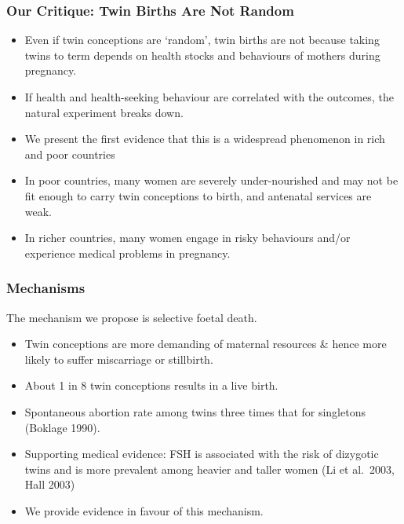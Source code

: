 \documentclass[9pt,letterpaper,subeqn]{beamer}
\begin{document}
\begin{frame}
  \frametitle{Our Critique: Twin Births Are Not Random}
  \begin{itemize}
  \item Even if twin conceptions are `random', twin births are not because taking twins to term depends on health stocks and behaviours of mothers during pregnancy.
  \item If health and health-seeking behaviour are correlated with the outcomes, the natural experiment breaks down.\\ \vspace{5mm}
  \item We present the first evidence that this is a widespread phenomenon in rich and poor countries
  \item In poor countries, many women are severely under-nourished and may not be fit enough to carry twin conceptions to birth, and antenatal services are weak. 
  \item In richer countries, many women engage in risky behaviours and/or experience medical problems in pregnancy.
  \end{itemize}
\end{frame}



\begin{frame}[label=mech1]
  \frametitle{Mechanisms}
  The mechanism we propose is selective foetal death. 
  \begin{itemize}
  \item Twin conceptions are more demanding of maternal resources \& hence more likely to suffer miscarriage or stillbirth.
  \item About 1 in 8 twin conceptions results in a live birth. 
	\item Spontaneous abortion rate among twins three times that for singletons (Boklage 1990). \\ \vspace{3mm}
  \item Supporting medical evidence: FSH is associated with the risk of dizygotic twins and is more prevalent among heavier and taller women (Li et al.\ 2003, Hall 2003) \\ \vspace{3mm}
  \item We provide evidence in favour of this mechanism.
\end{itemize}
\end{frame}
\end{document}
